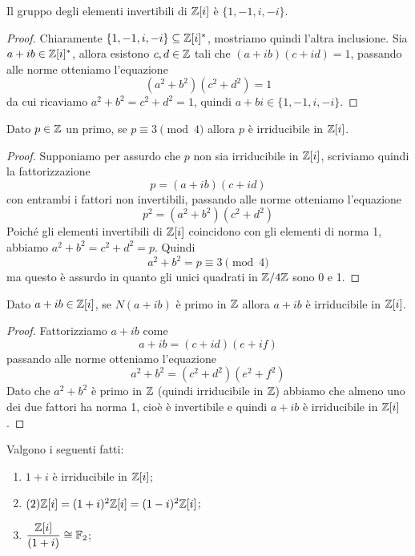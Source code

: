 \documentclass[11pt]{scrartcl}
\begin{document}
	\begin{lemma}
		Il gruppo degli elementi invertibili di $\mathbb Z[i]$ è $\{1, -1, i, -i\}$.
	\end{lemma}
	
	\begin{proof}
		Chiaramente $\{1, -1, i, -i\} \subseteq \mathbb Z[i]^*$, mostriamo quindi l'altra
		inclusione. Sia $a + ib \in \mathbb Z[i]^*$, allora esistono $c, d \in \mathbb Z$
		tali che $(a + ib)(c + id) = 1$, passando alle norme otteniamo l'equazione
		\[
		(a^2 + b^2)(c^2 + d^2) = 1
		\]
		da cui ricaviamo $a^2 + b^2 = c^2 + d^2 = 1$, quindi $a + bi \in \{1, -1, i, -i\}$.
	\end{proof}
	
	\begin{lemma}
		\label{lemma2.13}
		Dato $p \in \mathbb Z$ un primo, se $p \equiv 3 \pmod 4$ allora $p$ è irriducibile
		in $\mathbb Z[i]$.
	\end{lemma}
	
	\begin{proof}
		Supponiamo per assurdo che $p$ non sia irriducibile in $\mathbb Z[i]$, scriviamo quindi
		la fattorizzazione
		\[
		p = (a + ib)(c + id)
		\]
		con entrambi i fattori non invertibili, passando alle norme otteniamo 
		l'equazione
		\[
		p^2 = (a^2 + b^2)(c^2 + d^2)
		\]
		Poiché gli elementi invertibili di $\mathbb Z[i]$ coincidono con gli elementi di 
		norma 1, abbiamo $a^2 + b^2 = c^2 + d^2 = p$. Quindi 
		\[
		a^2 + b^2 = p \equiv 3 \pmod 4
		\]
		ma questo è assurdo in quanto gli unici quadrati in $\mathbb{Z}/{4}\mathbb{Z}$ sono 0 e 1.
	\end{proof}
	
	\begin{lemma}
		\label{lemma2.14}
		Dato $a + ib \in \mathbb Z[i]$, se $N(a + ib)$ è primo in $\mathbb Z$ allora $a + ib$
		è irriducibile in $\mathbb Z[i]$.
	\end{lemma}
	
	\begin{proof}
		Fattorizziamo $a + ib$ come 
		\[
		a + ib = (c + id)(e + if)
		\]
		passando alle norme otteniamo l'equazione
		\[
		a^2 + b^2 = (c^2 + d^2)(e^2 + f^2)
		\]
		Dato che $a^2 + b^2$ è primo in $\mathbb Z$ (quindi irriducibile in $\mathbb Z$)
		abbiamo che almeno uno dei due fattori ha norma 1, cioè è invertibile e 
		quindi $a + ib$ è irriducibile in $\mathbb Z[i]$.
	\end{proof}
	
	\begin{lemma}
		\label{lemma2.15}
		Valgono i seguenti fatti:
		\begin{enumerate}[(1)]
			\item $1 + i$ è irriducibile in $\mathbb Z[i]$;
			\item $(2)\mathbb Z[i] = (1 + i)^2\mathbb Z[i] = (1 - i)^2\mathbb Z[i]$;
			\item $\displaystyle\frac{\mathbb Z[i]}{(1 + i)}\cong \mathbb F_2$;
		\end{enumerate}
	\end{lemma}
	
\end{document}
